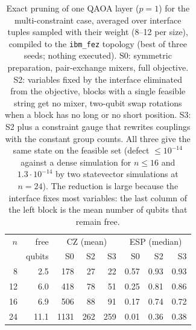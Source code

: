 \begin{table}[t]
\centering\footnotesize\setlength{\tabcolsep}{4pt}
\caption{ Exact pruning of one QAOA layer ($p=1$) for the multi-constraint case, averaged over interface tuples sampled with their weight (8--12 per size), compiled to the \texttt{ibm\_fez} topology (best of three seeds; nothing executed). S0: symmetric preparation, pair-exchange mixers, full objective. S2: variables fixed by the interface eliminated from the objective, blocks with a single feasible string get no mixer, two-qubit swap rotations when a block has no long or no short position. S3: S2 plus a constraint gauge that rewrites couplings with the constant group counts. All three give the same state on the feasible set (defect $\le10^{-14}$ against a dense simulation for $n\le16$ and $1.3\cdot10^{-14}$ by two statevector simulations at $n=24$). The reduction is large because the interface fixes most variables: the last column of the left block is the mean number of qubits that remain free.}\label{tab:core_prune}
\begin{tabular}{rrrrrrrr}
\toprule
$n$ & free & \multicolumn{3}{c}{CZ (mean)} & \multicolumn{3}{c}{ESP (median)}\\ & qubits & S0 & S2 & S3 & S0 & S2 & S3\\
\midrule
8 & 2.5 & 178 & 27 & 22 & 0.57 & 0.93 & 0.93\\
12 & 6.0 & 418 & 78 & 51 & 0.25 & 0.81 & 0.86\\
16 & 6.9 & 506 & 88 & 91 & 0.17 & 0.74 & 0.72\\
24 & 11.1 & 1131 & 262 & 259 & 0.01 & 0.36 & 0.38\\
\bottomrule
\end{tabular}
\end{table}
